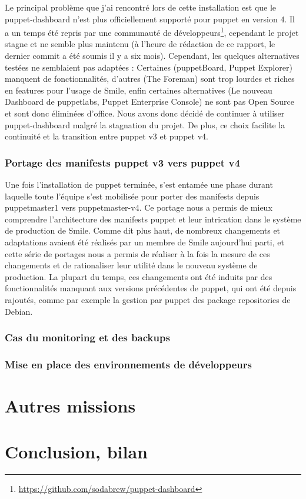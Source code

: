 \documentclass[14 pt]{extreport}
\begin{document}
Le principal problème que j'ai rencontré lors de cette installation est que le puppet-dashboard n'est plus officiellement supporté pour puppet en version 4. Il a un temps été repris par une communauté de développeurs\footnote{\url{https://github.com/sodabrew/puppet-dashboard}}, cependant le projet stagne et ne semble plus maintenu (à l'heure de rédaction de ce rapport, le dernier commit a été soumis il y a six mois). Cependant, les quelques alternatives testées ne semblaient pas adaptées : Certaines (puppetBoard, Puppet Explorer) manquent de fonctionnalités, d'autres (The Foreman) sont trop lourdes et riches en features pour l'usage de Smile, enfin certaines alternatives (Le nouveau Dashboard de puppetlabs, Puppet Enterprise Console) ne sont pas Open Source et sont donc éliminées d'office. Nous avons donc décidé de continuer à utiliser puppet-dashboard malgré la stagnation du projet. De plus, ce choix facilite la continuité et la transition entre puppet v3 et puppet v4.

\subsection{Portage des manifests puppet v3 vers puppet v4}

Une fois l'installation de puppet terminée, s'est entamée une phase durant laquelle toute l'équipe s'est mobilisée pour porter des manifests depuis puppetmaster1 vers puppetmaster-v4. Ce portage nous a permis de mieux comprendre l'architecture des manifests puppet et leur intrication dans le système de production de Smile. Comme dit plus haut, de nombreux changements et adaptations avaient été réalisés par un membre de Smile aujourd'hui parti, et cette série de portages nous a permis de réaliser à la fois la mesure de ces changements et de rationaliser leur utilité dans le nouveau système de production. La plupart du temps, ces changements ont été induits par des fonctionnalités manquant aux versions précédentes de puppet, qui ont été depuis rajoutés, comme par exemple la gestion par puppet des package repositories de Debian.

\subsection{Cas du monitoring et des backups}
\lipsum[1]
\lipsum[1]
\subsection{Mise en place des environnements de développeurs}



\lipsum[1]
\lipsum[1]

\chapter{Autres missions}
\lipsum

\chapter{Conclusion, bilan}
\lipsum[1]
\lipsum[1]
\end{document}
